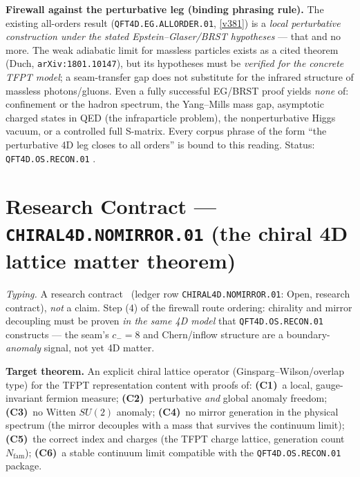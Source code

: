 \documentclass[11pt,a4paper]{article}
\newcommand{\Nfam}{N_{\mathrm{fam}}}
\begin{document}
\par\smallskip\noindent\textbf{Firewall against the perturbative leg (binding phrasing rule).}
The existing all-orders result (\texttt{QFT4D.EG.ALLORDER.01}, \vref{v381}) is a \emph{local
perturbative construction under the stated Epstein--Glaser/BRST hypotheses} --- that and no
more.  The weak adiabatic limit for massless particles exists as a cited theorem (Duch,
\texttt{arXiv:1801.10147}), but its hypotheses must be \emph{verified for the concrete TFPT
model}; a seam-transfer gap does not substitute for the infrared structure of massless
photons/gluons.  Even a fully successful EG/BRST proof yields \emph{none} of: confinement or the
hadron spectrum, the Yang--Mills mass gap, asymptotic charged states in QED (the infraparticle
problem), the nonperturbative Higgs vacuum, or a controlled full S-matrix.  Every corpus phrase
of the form ``the perturbative 4D leg closes to all orders'' is bound to this reading.
Status: \texttt{QFT4D.OS.RECON.01} \mO.

\section*{Research Contract --- \texttt{CHIRAL4D.NOMIRROR.01} (the chiral 4D lattice matter theorem)}
\noindent\emph{Typing.} A research contract \mO\ (ledger row \texttt{CHIRAL4D.NOMIRROR.01}:
Open, research contract), \emph{not} a claim.  Step (4) of the firewall route ordering: chirality
and mirror decoupling must be proven \emph{in the same 4D model} that
\texttt{QFT4D.OS.RECON.01} constructs --- the seam's $c_-{=}8$ and Chern/inflow structure are a
boundary-\emph{anomaly} signal, not yet 4D matter.

\par\smallskip\noindent\textbf{Target theorem.}  An explicit chiral lattice operator
(Ginsparg--Wilson/overlap type) for the TFPT representation content with proofs of:
\textbf{(C1)}~a local, gauge-invariant fermion measure; \textbf{(C2)}~perturbative \emph{and}
global anomaly freedom; \textbf{(C3)}~no Witten $SU(2)$ anomaly; \textbf{(C4)}~no mirror
generation in the physical spectrum (the mirror decouples with a mass that survives the
continuum limit); \textbf{(C5)}~the correct index and charges (the TFPT charge lattice,
generation count $\Nfam$); \textbf{(C6)}~a stable continuum limit compatible with the
\texttt{QFT4D.OS.RECON.01} package.
\end{document}
